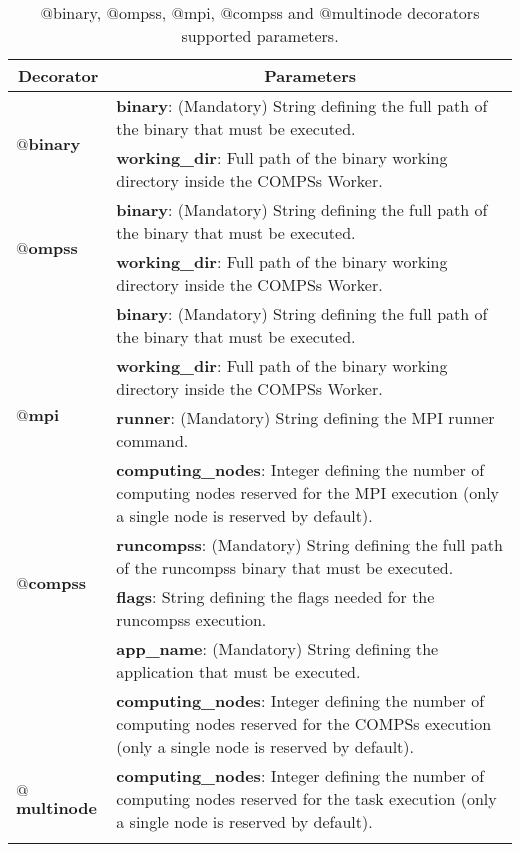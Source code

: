 \bgroup
  \def\arraystretch{1.4}%
  \begin{longtable}{| p{} | p{} |}
    \hline
    \multicolumn{1}{|c|}{{\bf Decorator }} &  \multicolumn{1}{c|}{{\bf Parameters }}\\
    \hline
        \multirow{2}{*}{{\bf $@$binary}} & {\bf binary}: (Mandatory) String defining the full path of the binary that must be executed. \\
                                         & {\bf working\_dir}: Full path of the binary working directory inside the COMPSs Worker. \\
    \hline
        \multirow{2}{*}{{\bf $@$ompss}} & {\bf binary}: (Mandatory) String defining the full path of the binary that must be executed. \\
                                        & {\bf working\_dir}: Full path of the binary working directory inside the COMPSs Worker. \\
    \hline
        \multirow{4}{*}{{\bf $@$mpi}} & {\bf binary}: (Mandatory) String defining the full path of the binary that must be executed. \\
                                      & {\bf working\_dir}: Full path of the binary working directory inside the COMPSs Worker. \\
                                      & {\bf runner}: (Mandatory) String defining the MPI runner command. \\
                                      & {\bf computing\_nodes}: Integer defining the number of computing nodes reserved for the MPI execution
                                        (only a single node is reserved by default). \\
    \hline
        \multirow{2}{*}{{\bf $@$compss}} & {\bf runcompss}: (Mandatory) String defining the full path of the runcompss binary that must be executed. \\
                                         & {\bf flags}: String defining the flags needed for the runcompss execution. \\
                                         & {\bf app\_name}: (Mandatory) String defining the application that must be executed. \\
                                         & {\bf computing\_nodes}: Integer defining the number of computing nodes reserved for the COMPSs execution
                                           (only a single node is reserved by default). \\
    \hline
        \multirow{2}{*}{{\bf $@$multinode}} & {\bf computing\_nodes}: Integer defining the number of computing nodes reserved for the task execution
                                              (only a single node is reserved by default). \\
    \hline
     \caption{$@$binary, $@$ompss, $@$mpi, $@$compss and $@$multinode decorators supported parameters.}
    \label{tab:other_decorators}
  \end{longtable}
\egroup

